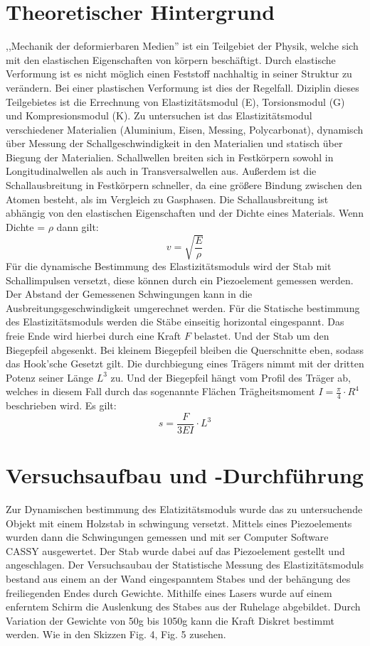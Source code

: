 \documentclass[11pt, a4paper]{article}
\begin{document}
\section{Theoretischer Hintergrund}
,,Mechanik der deformierbaren Medien'' ist ein Teilgebiet der Physik, welche sich mit den elastischen Eigenschaften von körpern beschäftigt. Durch elastische Verformung ist es nicht möglich einen Feststoff nachhaltig in seiner Struktur zu verändern. Bei einer plastischen Verformung ist dies der Regelfall. Diziplin dieses Teilgebietes ist die Errechnung von Elastizitätsmodul (E), Torsionsmodul (G) und Kompresionsmodul (K). Zu untersuchen ist das Elastizitätsmodul verschiedener Materialien (Aluminium, Eisen, Messing, Polycarbonat), dynamisch über Messung der Schallgeschwindigkeit in den Materialien und statisch über Biegung der Materialien. Schallwellen breiten sich in Festkörpern sowohl in Longitudinalwellen als auch in Transversalwellen aus. Außerdem ist die Schallausbreitung in Festkörpern schneller, da eine größere Bindung zwischen den Atomen besteht, als im Vergleich zu Gasphasen. Die Schallausbreitung ist abhängig von den elastischen Eigenschaften und der Dichte eines Materials. Wenn Dichte = $\rho$ dann gilt: $$v=\displaystyle{\sqrt{\frac{E}{\rho}}}$$ Für die dynamische Bestimmung des Elastizitätsmoduls wird der Stab mit Schallimpulsen versetzt, diese können durch ein Piezoelement gemessen werden. Der Abstand der Gemessenen Schwingungen kann in die Ausbreitungsgeschwindigkeit umgerechnet werden. Für die Statische bestimmung des Elastizitätsmoduls werden die Stäbe einseitig horizontal eingespannt. Das freie Ende wird hierbei durch eine Kraft $F$ belastet. Und der Stab um den Biegepfeil abgesenkt. Bei kleinem Biegepfeil bleiben die Querschnitte eben, sodass das Hook'sche Gesetzt gilt. Die durchbiegung eines Trägers nimmt mit der dritten Potenz seiner Länge $L^3$ zu. Und der Biegepfeil hängt vom Profil des Träger ab, welches in diesem Fall durch das sogenannte Flächen Trägheitsmoment $I=\frac{\pi}{4}\cdot R^4$ beschrieben wird. Es gilt: $$s=\frac{F}{3EI}\cdot L^3$$

\section{Versuchsaufbau und -Durchführung}
Zur Dynamischen bestimmung des Elatizitätsmoduls wurde das zu untersuchende Objekt mit einem Holzstab in schwingung versetzt. Mittels eines Piezoelements wurden dann die Schwingungen gemessen und mit ser Computer Software CASSY ausgewertet. Der Stab wurde dabei auf das Piezoelement gestellt und angeschlagen. Der Versuchsaubau der Statistische Messung des Elastizitätsmoduls bestand aus einem an der Wand eingespanntem Stabes und der behängung des freiliegenden Endes durch Gewichte. Mithilfe eines Lasers wurde auf einem enferntem Schirm die Auslenkung des Stabes aus der Ruhelage abgebildet. Durch Variation der Gewichte von 50g bis 1050g kann die Kraft Diskret bestimmt werden. Wie in den Skizzen Fig. 4, Fig. 5 zusehen. \newpage
\end{document}
